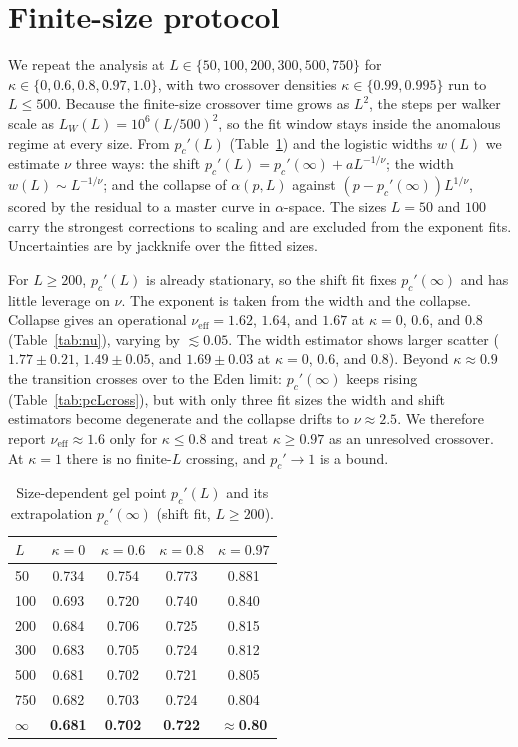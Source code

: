 \documentclass[aps,prl,twocolumn,superscriptaddress,floatfix,nofootinbib,longbibliography]{revtex4-2}
\newcommand{\pcp}{p_c'}
\newcommand{\kap}{\kappa}
\newcommand{\nueff}{\nu_{\mathrm{eff}}}
\begin{document}



\appendix
\section{Finite-size protocol}
\label{app:fss}
We repeat the analysis at $L\in\{50,100,200,300,500,750\}$ for
$\kap\in\{0,0.6,0.8,0.97,1.0\}$, with two crossover densities
$\kap\in\{0.99,0.995\}$ run to $L\le500$. Because the finite-size crossover
time grows as $L^2$, the steps per walker scale as $L_W(L)=10^6(L/500)^2$, so
the fit window stays inside the anomalous regime at every size. From
$\pcp(L)$ (Table~\ref{tab:pcL}) and the logistic widths $w(L)$ we estimate
$\nu$ three ways: the shift $\pcp(L)=\pcp(\infty)+aL^{-1/\nu}$; the width
$w(L)\sim L^{-1/\nu}$; and the collapse of $\alpha(p,L)$ against
$(p-\pcp(\infty))L^{1/\nu}$, scored by the residual to a master curve in
$\alpha$-space. The sizes $L=50$ and $100$ carry the strongest corrections to
scaling and are excluded from the exponent fits. Uncertainties are by jackknife
over the fitted sizes.

For $L\ge200$, $\pcp(L)$ is already stationary, so the shift fit fixes
$\pcp(\infty)$ and has little leverage on $\nu$. The exponent is taken from
the width and the collapse. Collapse gives an operational $\nueff=1.62$, $1.64$, and $1.67$
at $\kap=0$, $0.6$, and $0.8$ (Table~\ref{tab:nu}), varying by $\lesssim0.05$.
The width estimator shows larger scatter ($1.77\pm0.21$, $1.49\pm0.05$, and
$1.69\pm0.03$ at $\kap=0$, $0.6$, and $0.8$). Beyond $\kap\approx0.9$ the transition crosses over
to the Eden limit: $\pcp(\infty)$ keeps rising
(Table~\ref{tab:pcLcross}), but with only three fit sizes the width and shift
estimators become degenerate and the collapse drifts to $\nu\approx2.5$. We
therefore report $\nueff\approx1.6$ only for $\kap\le0.8$ and treat
$\kap\ge0.97$ as an unresolved crossover. At $\kap=1$ there is no finite-$L$
crossing, and $\pcp\to1$ is a bound.

\begin{table}[h]
\centering
\caption{Size-dependent gel point $\pcp(L)$ and its extrapolation
$\pcp(\infty)$ (shift fit, $L\ge200$).}
\label{tab:pcL}
\begin{tabular}{lcccc}
\toprule
$L$ & $\kap=0$ & $\kap=0.6$ & $\kap=0.8$ & $\kap=0.97$ \\
\midrule
50   & 0.734 & 0.754 & 0.773 & 0.881 \\
100  & 0.693 & 0.720 & 0.740 & 0.840 \\
200  & 0.684 & 0.706 & 0.725 & 0.815 \\
300  & 0.683 & 0.705 & 0.724 & 0.812 \\
500  & 0.681 & 0.702 & 0.721 & 0.805 \\
750  & 0.682 & 0.703 & 0.724 & 0.804 \\
\midrule
$\infty$ & \textbf{0.681} & \textbf{0.702} & \textbf{0.722} & \textbf{$\approx$0.80} \\
\bottomrule
\end{tabular}
\end{table}
\end{document}
